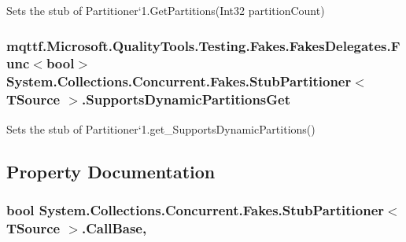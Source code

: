 Sets the stub of Partitioner`1.Get\-Partitions(\-Int32 partition\-Count)

\hypertarget{class_system_1_1_collections_1_1_concurrent_1_1_fakes_1_1_stub_partitioner_3_01_t_source_01_4_aa20b07041af2b3c4eb7c860739cac829}{
\subsubsection[{Supports\-Dynamic\-Partitions\-Get}]{\setlength{\rightskip}{0pt plus 5cm}mqttf.\-Microsoft.\-Quality\-Tools.\-Testing.\-Fakes.\-Fakes\-Delegates.\-Func$<$bool$>$ System.\-Collections.\-Concurrent.\-Fakes.\-Stub\-Partitioner$<$ T\-Source $>$.Supports\-Dynamic\-Partitions\-Get}}\label{class_system_1_1_collections_1_1_concurrent_1_1_fakes_1_1_stub_partitioner_3_01_t_source_01_4_aa20b07041af2b3c4eb7c860739cac829}


Sets the stub of Partitioner`1.get\-\_\-\-Supports\-Dynamic\-Partitions()



\subsection{Property Documentation}
\hypertarget{class_system_1_1_collections_1_1_concurrent_1_1_fakes_1_1_stub_partitioner_3_01_t_source_01_4_ab9f54a2d34444d85d01590c3f0d2d53c}{
\subsubsection[{Call\-Base}]{\setlength{\rightskip}{0pt plus 5cm}bool System.\-Collections.\-Concurrent.\-Fakes.\-Stub\-Partitioner$<$ T\-Source $>$.Call\-Base\hspace{0.3cm}{\ttfamily [get]}, {\ttfamily [set]}}}\label{class_system_1_1_collections_1_1_concurrent_1_1_fakes_1_1_stub_partitioner_3_01_t_source_01_4_ab9f54a2d34444d85d01590c3f0d2d53c}



